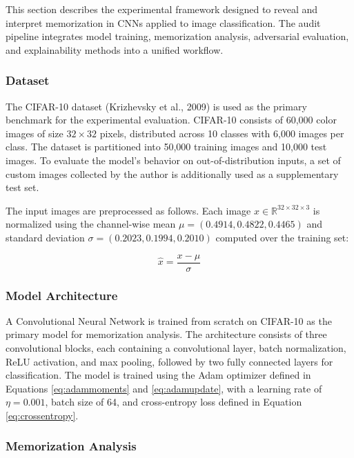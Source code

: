 
This section describes the experimental framework 
designed to reveal and interpret memorization in 
CNNs applied to image classification. The audit 
pipeline integrates model training, memorization 
analysis, adversarial evaluation, and explainability 
methods into a unified workflow.

\subsubsection{Dataset}

The CIFAR-10 dataset (Krizhevsky et al., 2009) is 
used as the primary benchmark for the experimental 
evaluation. CIFAR-10 consists of 60,000 color images 
of size $32 \times 32$ pixels, distributed across 
10 classes with 6,000 images per class. The dataset 
is partitioned into 50,000 training images and 10,000 
test images. To evaluate the model's behavior on 
out-of-distribution inputs, a set of custom images 
collected by the author is additionally used as a 
supplementary test set.

The input images are preprocessed as follows. Each 
image $x \in \mathbb{R}^{32 \times 32 \times 3}$ is 
normalized using the channel-wise mean 
$\mu = (0.4914, 0.4822, 0.4465)$ and standard 
deviation $\sigma = (0.2023, 0.1994, 0.2010)$ 
computed over the training set:

\begin{equation}
\hat{x} = \frac{x - \mu}{\sigma}
\label{eq:normalization}
\end{equation}

\subsubsection{Model Architecture}

A Convolutional Neural Network is trained from 
scratch on CIFAR-10 as the primary model for 
memorization analysis. The architecture consists 
of three convolutional blocks, each containing 
a convolutional layer, batch normalization, ReLU 
activation, and max pooling, followed by two 
fully connected layers for classification. The 
model is trained using the Adam optimizer defined 
in Equations \ref{eq:adammoments} and 
\ref{eq:adamupdate}, with a learning rate of 
$\eta = 0.001$, batch size of 64, and 
cross-entropy loss defined in Equation 
\ref{eq:crossentropy}.

\subsubsection{Memorization Analysis}

